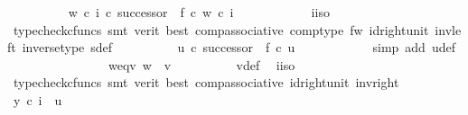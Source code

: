\begin{isabellebody}
\ \ \ \ \ \ \ \ \isamarkupfalse%
\ {\isachardoublequoteopen}{\isacharparenleft}{\kern0pt}w\ {\isasymcirc}\isactrlsub c\ i{\isacharparenright}{\kern0pt}\ {\isasymcirc}\isactrlsub c\ successor\ {\isacharequal}{\kern0pt}\ f\ {\isasymcirc}\isactrlsub c\ w\ {\isasymcirc}\isactrlsub c\ i{\isachardoublequoteclose}\isanewline
\ \ \ \ \ \ \ \ \ \ \isamarkupfalse%
\ i{\isacharunderscore}{\kern0pt}iso\ \isamarkupfalse%
\ {\isacharparenleft}{\kern0pt}typecheck{\isacharunderscore}{\kern0pt}cfuncs{\isacharcomma}{\kern0pt}\ smt\ {\isacharparenleft}{\kern0pt}verit{\isacharcomma}{\kern0pt}\ best{\isacharparenright}{\kern0pt}\ comp{\isacharunderscore}{\kern0pt}associative{}\ comp{\isacharunderscore}{\kern0pt}type\ f{\isacharunderscore}{\kern0pt}w\ id{\isacharunderscore}{\kern0pt}right{\isacharunderscore}{\kern0pt}unit{}\ inv{\isacharunderscore}{\kern0pt}left\ inverse{\isacharunderscore}{\kern0pt}type\ s{\isacharunderscore}{\kern0pt}def{\isacharparenright}{\kern0pt}\isanewline
\ \ \ \ \ \ \ \ \isamarkupfalse%
\ {\isachardoublequoteopen}u\ {\isasymcirc}\isactrlsub c\ successor\ {\isacharequal}{\kern0pt}\ f\ {\isasymcirc}\isactrlsub c\ u{\isachardoublequoteclose}\isanewline
\ \ \ \ \ \ \ \ \ \ \isamarkupfalse%
\ {\isacharparenleft}{\kern0pt}simp\ add{\isacharcolon}{\kern0pt}\ u{\isacharunderscore}{\kern0pt}def{\isacharparenright}{\kern0pt}\isanewline
\ \ \ \ \ \ \isamarkupfalse%
\isanewline
\ \ \ \ \ \ \isamarkupfalse%
\ \isamarkupfalse%
\ w{\isacharunderscore}{\kern0pt}eq{\isacharunderscore}{\kern0pt}v{\isacharcolon}{\kern0pt}\ {\isachardoublequoteopen}w\ {\isacharequal}{\kern0pt}\ v{\isachardoublequoteclose}\isanewline
\ \ \ \ \ \ \ \ \isamarkupfalse%
\ v{\isacharunderscore}{\kern0pt}def\ \isamarkupfalse%
\ i{\isacharunderscore}{\kern0pt}iso\isanewline
\ \ \ \ \ \ \ \ \isamarkupfalse%
\ {\isacharparenleft}{\kern0pt}typecheck{\isacharunderscore}{\kern0pt}cfuncs{\isacharcomma}{\kern0pt}\ smt\ {\isacharparenleft}{\kern0pt}verit{\isacharcomma}{\kern0pt}\ best{\isacharparenright}{\kern0pt}\ comp{\isacharunderscore}{\kern0pt}associative{}\ id{\isacharunderscore}{\kern0pt}right{\isacharunderscore}{\kern0pt}unit{}\ inv{\isacharunderscore}{\kern0pt}right{\isacharparenright}{\kern0pt}\isanewline
\isanewline
\ \ \ \ \ \ \isamarkupfalse%
\ {\isachardoublequoteopen}y\ {\isasymcirc}\isactrlsub c\ i\ {\isacharequal}{\kern0pt}\ u{\isachardoublequoteclose}\isanewline

\end{isabellebody}

